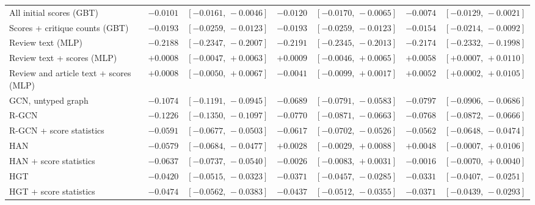 \begin{table}[t]
\begin{tabular}{@{}lrrrrrr@{}}
All initial scores (GBT) & $-0.0101$ & $[-0.0161,\,-0.0046]$ & $-0.0120$ & $[-0.0170,\,-0.0065]$ & $-0.0074$ & $[-0.0129,\,-0.0021]$ \\
Scores + critique counts (GBT) & $-0.0193$ & $[-0.0259,\,-0.0123]$ & $-0.0193$ & $[-0.0259,\,-0.0123]$ & $-0.0154$ & $[-0.0214,\,-0.0092]$ \\
Review text (MLP) & $-0.2188$ & $[-0.2347,\,-0.2007]$ & $-0.2191$ & $[-0.2345,\,-0.2013]$ & $-0.2174$ & $[-0.2332,\,-0.1998]$ \\
Review text + scores (MLP) & $+0.0008$ & $[-0.0047,\,+0.0063]$ & $+0.0009$ & $[-0.0046,\,+0.0065]$ & $+0.0058$ & $[+0.0007,\,+0.0110]$ \\
Review and article text + scores (MLP) & $+0.0008$ & $[-0.0050,\,+0.0067]$ & $-0.0041$ & $[-0.0099,\,+0.0017]$ & $+0.0052$ & $[+0.0002,\,+0.0105]$ \\
GCN, untyped graph & $-0.1074$ & $[-0.1191,\,-0.0945]$ & $-0.0689$ & $[-0.0791,\,-0.0583]$ & $-0.0797$ & $[-0.0906,\,-0.0686]$ \\
R-GCN & $-0.1226$ & $[-0.1350,\,-0.1097]$ & $-0.0770$ & $[-0.0871,\,-0.0663]$ & $-0.0768$ & $[-0.0872,\,-0.0666]$ \\
R-GCN + score statistics & $-0.0591$ & $[-0.0677,\,-0.0503]$ & $-0.0617$ & $[-0.0702,\,-0.0526]$ & $-0.0562$ & $[-0.0648,\,-0.0474]$ \\
HAN & $-0.0579$ & $[-0.0684,\,-0.0477]$ & $+0.0028$ & $[-0.0029,\,+0.0088]$ & $+0.0048$ & $[-0.0007,\,+0.0106]$ \\
HAN + score statistics & $-0.0637$ & $[-0.0737,\,-0.0540]$ & $-0.0026$ & $[-0.0083,\,+0.0031]$ & $-0.0016$ & $[-0.0070,\,+0.0040]$ \\
HGT & $-0.0420$ & $[-0.0515,\,-0.0323]$ & $-0.0371$ & $[-0.0457,\,-0.0285]$ & $-0.0331$ & $[-0.0407,\,-0.0251]$ \\
HGT + score statistics & $-0.0474$ & $[-0.0562,\,-0.0383]$ & $-0.0437$ & $[-0.0512,\,-0.0355]$ & $-0.0371$ & $[-0.0439,\,-0.0293]$ \\
\bottomrule
\end{tabular}
\end{table}
